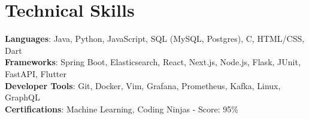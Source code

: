 \documentclass[letterpaper,11pt]{article}
\newcommand{\resumeSubHeadingListEnd}{\end{itemize}}
\begin{document}



%
\section{Technical Skills}
\begin{itemize}[leftmargin=0.15in, label={}]
  \small{\item{
        \textbf{Languages}{: Java, Python, JavaScript, SQL (MySQL, Postgres), C, HTML/CSS, Dart} \\
        \textbf{Frameworks}{: Spring Boot, Elasticsearch, React, Next.js, Node.js, Flask, JUnit, FastAPI, Flutter} \\
        \textbf{Developer Tools}{: Git, Docker, Vim, Grafana, Prometheus, Kafka, Linux, GraphQL} \\
        \textbf{Certifications}{: Machine Learning, Coding Ninjas - Score: 95\%}
        }}
\end{itemize}


\end{document}
